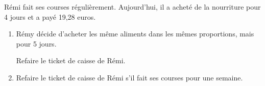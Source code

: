 \documentclass[exercice]{thedocument}%
\begin{document}
%
Rémi fait ses courses régulièrement. Aujourd'hui, il a acheté de
la nourriture pour 4 jours et a payé 19,28 euros.\vskip10pt{\centering
{}
}\vskip10pt
\begin{enumerate}
    \item Rémy décide d'acheter les même aliments dans les mêmes proportions,
    mais pour 5 jours.\par
    Refaire le ticket de caisse de Rémi.
    \item Refaire le ticket de caisse de Rémi s'il fait ses courses pour une
    semaine.
\end{enumerate}
\end{document}
